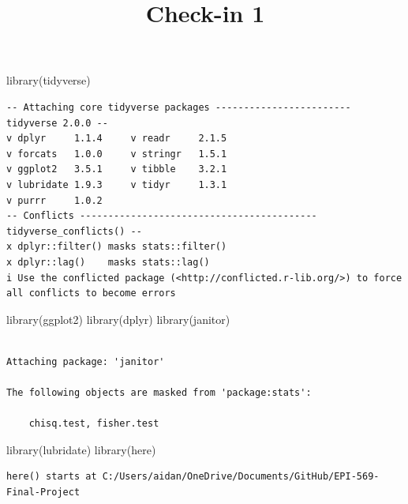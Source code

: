 \documentclass[
  letterpaper,
  DIV=11,
  numbers=noendperiod]{scrartcl}
\title{Check-in 1}
\author{}
\date{}
\newenvironment{Shaded}{\begin{snugshade}}{\end{snugshade}}
\newcommand{\FunctionTok}[1]{\textcolor[rgb]{0.28,0.35,0.67}{#1}}
\newcommand{\NormalTok}[1]{\textcolor[rgb]{0.00,0.23,0.31}{#1}}
\begin{document}
\maketitle


\begin{Shaded}
\begin{Highlighting}[]
\FunctionTok{library}\NormalTok{(tidyverse)}
\end{Highlighting}
\end{Shaded}

\begin{verbatim}
-- Attaching core tidyverse packages ------------------------ tidyverse 2.0.0 --
v dplyr     1.1.4     v readr     2.1.5
v forcats   1.0.0     v stringr   1.5.1
v ggplot2   3.5.1     v tibble    3.2.1
v lubridate 1.9.3     v tidyr     1.3.1
v purrr     1.0.2     
-- Conflicts ------------------------------------------ tidyverse_conflicts() --
x dplyr::filter() masks stats::filter()
x dplyr::lag()    masks stats::lag()
i Use the conflicted package (<http://conflicted.r-lib.org/>) to force all conflicts to become errors
\end{verbatim}

\begin{Shaded}
\begin{Highlighting}[]
\FunctionTok{library}\NormalTok{(ggplot2)}
\FunctionTok{library}\NormalTok{(dplyr)}
\FunctionTok{library}\NormalTok{(janitor)}
\end{Highlighting}
\end{Shaded}

\begin{verbatim}

Attaching package: 'janitor'

The following objects are masked from 'package:stats':

    chisq.test, fisher.test
\end{verbatim}

\begin{Shaded}
\begin{Highlighting}[]
\FunctionTok{library}\NormalTok{(lubridate)}
\FunctionTok{library}\NormalTok{(here)}
\end{Highlighting}
\end{Shaded}

\begin{verbatim}
here() starts at C:/Users/aidan/OneDrive/Documents/GitHub/EPI-569-Final-Project
\end{verbatim}
\end{document}
